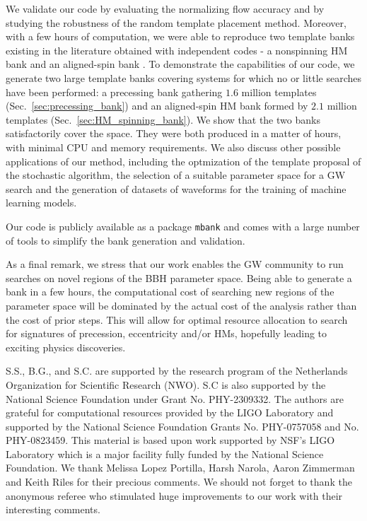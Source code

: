 \documentclass[twocolumn,showpacs,preprintnumbers,nofootinbib,prd,
superscriptaddress,10pt]{revtex4-2}
\begin{document}
We validate our code by evaluating the normalizing flow accuracy and by studying the robustness of the random template placement method.
Moreover, with a few hours of computation, we were able to reproduce two template banks existing in the literature obtained with independent codes - a nonspinning HM bank \cite{Harry:2017weg} and an aligned-spin bank \cite{Sakon:2022ibh}.
To demonstrate the capabilities of our code, we generate two large template banks covering systems for which no or little searches have been performed: a precessing bank gathering $1.6$ million templates (Sec.~\ref{sec:precessing_bank}) and an aligned-spin HM bank formed by $2.1$ million templates (Sec.~\ref{sec:HM_spinning_bank}). We show that the two banks satisfactorily cover the space. They were both produced in a matter of hours, with minimal CPU and memory requirements.
We also discuss other possible applications of our method, including the optmization of the template proposal of the stochastic algorithm, the selection of a suitable parameter space for a GW search and the generation of datasets of waveforms for the training of machine learning models.

Our code is publicly available as a package \texttt{mbank}\cite{mbank} and comes with a large number of tools to simplify the bank generation and validation.

As a final remark, we stress that our work enables the GW community to run searches on novel regions of the BBH parameter space. Being able to generate a bank in a few hours, the computational cost of searching new regions of the parameter space will be dominated by the actual cost of the analysis rather than the cost of prior steps.
This will allow for optimal resource allocation to search for signatures of precession, eccentricity and/or HMs, hopefully leading to exciting physics discoveries.


        \begin{acknowledgments}
		S.S., B.G., and S.C. are supported by the research program of the Netherlands Organization for Scientific Research (NWO). S.C is also supported by the National Science Foundation under Grant No. PHY-2309332.
		The authors are grateful for computational resources provided by the LIGO Laboratory and supported by the National Science Foundation Grants No. PHY-0757058 and No. PHY-0823459. This material is based upon work supported by NSF’s LIGO Laboratory which is a major facility fully funded by the National Science Foundation.
		We thank Melissa Lopez Portilla, Harsh Narola, Aaron Zimmerman and Keith Riles for their precious comments. We should not forget to thank the anonymous referee who stimulated huge improvements to our work with their interesting comments.
        \end{acknowledgments}
\end{document}
